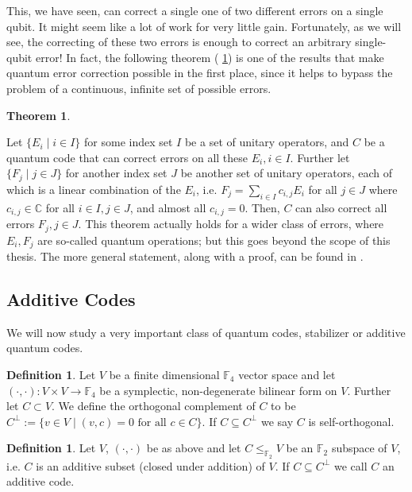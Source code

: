 \documentclass[12pt,a4paper,BCOR15mm,twoside,DIV12]{article}
\def\F{\mathbb{F}}
\def\C{\mathbb{C}}
\def\fa{\text{ for all }}
\theoremstyle{definition}
\newtheorem{theorem}[Satz]{Theorem}
\newtheorem{defn}[Satz]{Definition}
\begin{document}
This, we have seen, can correct a single one of two different errors on a single qubit. It might seem like a lot of work for very little gain. 
Fortunately, as we will see, the correcting of these two errors is enough to correct an arbitrary single-qubit error!
In fact, the following theorem ( \ref{linearcombinationerrors}) is one of the results that make quantum error correction possible in the first place, since it helps to bypass the problem of a continuous, infinite set of possible errors.

\begin{theorem}\label{linearcombinationerrors}

Let $\{ E_i \mid i \in I \}$ for some index set $I$ be a set of unitary operators, and $C$ be a quantum code that can correct errors on all these $E_i, i \in I$. Further let $\{ F_j \mid j \in J \}$ for another index set $J$ be another set of unitary operators, each of which is a linear combination of the $E_i$, i.e. $ F_j = \sum_{i \in I} c_{i,j} E_i$ for all $j \in J$ where $c_{i,j} \in \C$ for all $i \in I, j \in J$, and almost all $c_{i,j} = 0$.
Then, $C$ can also correct all errors $F_j, j \in J$. This theorem actually holds for a wider class of errors, where $E_i, F_j$ are so-called quantum operations; but this goes beyond the scope of this thesis. The more general statement, along with a proof, can be found in \cite{NC}.
\end{theorem}

\subsection{Additive Codes}

We will now study a very important class of quantum codes, stabilizer or additive quantum codes.

\begin{defn}
  Let $V$ be a finite dimensional $\F_4$ vector space and let $(\cdot, \cdot): V \times V \rightarrow \F_4$ be a symplectic, non-degenerate bilinear form on $V$. Further let $C \subset V$. We define the orthogonal complement of $C$ to be $C^\perp := \{ v \in V \mid (v,c) = 0 \fa c \in C \}$. If $C \subseteq C^\perp$ we say $C$ is self-orthogonal.
 \end{defn}

\begin{defn}
Let $V$, $(\cdot,\cdot)$ be as above and let $C \leq_{\F_2} V$ be an $\F_2$ subspace of $V$, i.e. $C$ is an additive subset (closed under addition) of $V$. If $C \subseteq C^\perp$ we call $C$ an additive code.
\end{defn}
\end{document}
